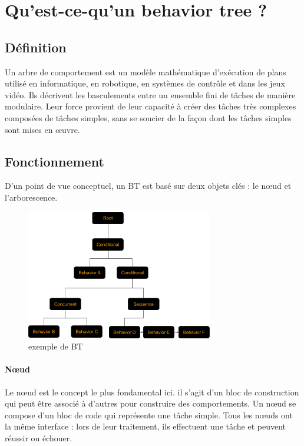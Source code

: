 \documentclass[titlepage]{article}
\begin{document}
	\section{Qu'est-ce-qu'un behavior tree ?}
		\subsection{Définition}
		Un arbre de comportement est un modèle mathématique d'exécution de plans utilisé en informatique, en robotique, en systèmes de contrôle et dans les jeux vidéo. Ils décrivent les basculements entre un ensemble fini de tâches de manière modulaire. Leur force provient de leur capacité à créer des tâches très complexes composées de tâches simples, sans se soucier de la façon dont les tâches simples sont mises en œuvre. \cite{wikipedia_BT}
		\subsection{Fonctionnement}
		
		D'un point de vue conceptuel, un BT est basé sur deux objets clés : le nœud et l'arborescence.
		
		\begin{figure}[h!]
			\includegraphics[width=\linewidth]{img/behavior_trees_example.png}
			\caption{exemple de BT \cite{rasmussen}}
			\label{fig:BT1}
		\end{figure}
		
		\paragraph{Nœud}
		Le nœud est le concept le plus fondamental ici. il s'agit d'un bloc de construction qui peut être associé à d'autres pour construire des comportements. Un nœud se compose d'un bloc de code qui représente une tâche simple. Tous les nœuds ont la même interface : lors de leur traitement, ils effectuent une tâche et peuvent réussir ou échouer.
		
\end{document}
